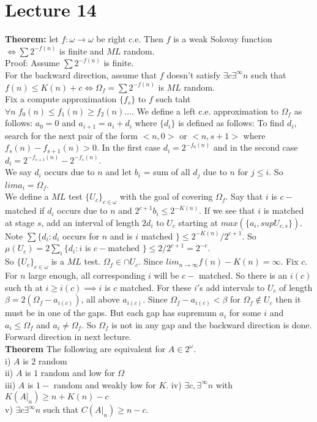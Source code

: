 \documentclass{article}
\begin{document}
      \section{Lecture 14}
      \textbf{Theorem:} let $f: \omega \to \omega$ be right c.e. Then $f$ is a weak Solovay function $\iff \sum 2^{-f(n)}$ is finite and $ML$ random.\\
      Proof: Assume $\sum 2^{-f(n)}$ is finite. \\
      For the backward direction, assume that $f$ doesn't satisfy $\exists c\exists^\infty n $ such that $f(n) \leq K(n) + c \iff \Omega_f = \sum 2^{-f(n)}$ is $ML$ random. \\
      Fix a compute approximation $\{f_s\}$ to $f$ such taht $\forall n \; f_0(n)\leq f_1(n)\geq f_2(n)...$. We define a left c.e. approximation to $\Omega_f$ as follows: $a_0 = 0$ and $a_{i+1} = a_i+ d_i$ where $\{d_i\}$ is defined as follows: To find $d_i$, search for the next pair of the form $<n,0>$ or $<n,s+1>$ where $f_s(n) - f_{s+1}(n)> 0$. In the first case $d_i = 2^{-f_0(n)}$ and in the second case $d_i = 2^{-f_{s+1}(n)} - 2^{-f_s(n)}$.\\
      We say $d_i$ occurs due to $n$ and let $b_i$ = sum of all $d_j$ due to $n$ for $j\leq i$. So $lim a_i = \Omega_f$. \\
      We define a $ML$ test $\{U_c\}_{c \in \omega}$ with the goal of covering $\Omega_f$. Say that $i$ is $c-$ matched if $d_i$ occurs due to $n$ and $2^{c+1}b_i \leq 2^{-K(n)}$. If we see that $i$ is matched at stage $s$, add an interval of length $2d_i$ to $U_c$ starting at $max(\{a_i, sup U_{c,s}\}) $.\\Note $\sum \{d_i : d_i $ occurs for $n$ and is $i$ matched $\} \leq 2^{-K(n)}/2^{c+1}$. So $\mu(U_c) = 2\sum_i \{d_i : i $ is $c- $matched $\} \le 2/2^{c+1} = 2^{-c}$.\\
      So $\{U_c\}_{c\in \omega}$ is a $ML$ test. $\Omega_f \in \cap U_c$. Since $lim_{n \to \infty} f(n) - K(n) = \infty$. Fix $c$. For $n$ large enough, all corresponding $i$ will be $c-$ matched. So there is an $i(c)$ such th at $i \geq i(c) \implies i $ is $ c $ matched. For these $i'$s add intervals to $U_c$ of length $\beta = 2(\Omega_f - a_{i(c)})$, all above $a_{i(c)}$. Since $\Omega_f - a_{i(c)} < \beta$ for $\Omega_f \not \in U_c$ then it must be in one of the gaps. But each gap has supremum $a_i$ for some $i$ and $a_i \leq \Omega_f$ and $a_i \neq \Omega_f$. So $\Omega_f$ is not in any gap and the backward direction is done.\\
     Forward direction in next lecture.\\
      \textbf{Theorem}  The following are equivalent for $A \in 2^\omega$.\\
      i) $A$ is $2$ random \\
      ii) $A $ is $1$ random and low for $\Omega$\\
      iii) $A$ is $1-$ random and weakly low for $K$.
      iv) $\exists c, \exists^\infty n$ with $K(A|_n) \geq n+K(n) -c$\\
      v) $\exists c \exists^\infty n $ such that $C(A|_n) \geq n-c$.\\ \newpage
\end{document}
